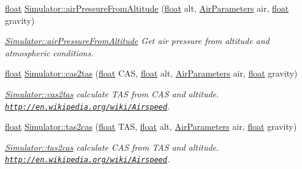 \begin{DoxyCompactItemize}
\item 
\hyperlink{_super_l_u_support_8h_a6a1bb6ed41f44b60e7bd83b0e9945aa7}{float} \hyperlink{group___h_i_t_l_plugin_gab5a7232560191dad8ff19517ed4a327a}{Simulator\-::air\-Pressure\-From\-Altitude} (\hyperlink{_super_l_u_support_8h_a6a1bb6ed41f44b60e7bd83b0e9945aa7}{float} alt, \hyperlink{struct_air_parameters}{Air\-Parameters} air, \hyperlink{_super_l_u_support_8h_a6a1bb6ed41f44b60e7bd83b0e9945aa7}{float} gravity)
\begin{DoxyCompactList}\small\item\em \hyperlink{group___h_i_t_l_plugin_gab5a7232560191dad8ff19517ed4a327a}{Simulator\-::air\-Pressure\-From\-Altitude} Get air pressure from altitude and atmospheric conditions. \end{DoxyCompactList}\item 
\hyperlink{_super_l_u_support_8h_a6a1bb6ed41f44b60e7bd83b0e9945aa7}{float} \hyperlink{group___h_i_t_l_plugin_ga86d7635f63f32cf0ef08e21a7e2874ea}{Simulator\-::cas2tas} (\hyperlink{_super_l_u_support_8h_a6a1bb6ed41f44b60e7bd83b0e9945aa7}{float} C\-A\-S, \hyperlink{_super_l_u_support_8h_a6a1bb6ed41f44b60e7bd83b0e9945aa7}{float} alt, \hyperlink{struct_air_parameters}{Air\-Parameters} air, \hyperlink{_super_l_u_support_8h_a6a1bb6ed41f44b60e7bd83b0e9945aa7}{float} gravity)
\begin{DoxyCompactList}\small\item\em \hyperlink{group___h_i_t_l_plugin_ga86d7635f63f32cf0ef08e21a7e2874ea}{Simulator\-::cas2tas} calculate T\-A\-S from C\-A\-S and altitude. \href{http://en.wikipedia.org/wiki/Airspeed}{\tt http\-://en.\-wikipedia.\-org/wiki/\-Airspeed}. \end{DoxyCompactList}\item 
\hyperlink{_super_l_u_support_8h_a6a1bb6ed41f44b60e7bd83b0e9945aa7}{float} \hyperlink{group___h_i_t_l_plugin_gaf6d17454fad82383037d44ed3cb93a12}{Simulator\-::tas2cas} (\hyperlink{_super_l_u_support_8h_a6a1bb6ed41f44b60e7bd83b0e9945aa7}{float} T\-A\-S, \hyperlink{_super_l_u_support_8h_a6a1bb6ed41f44b60e7bd83b0e9945aa7}{float} alt, \hyperlink{struct_air_parameters}{Air\-Parameters} air, \hyperlink{_super_l_u_support_8h_a6a1bb6ed41f44b60e7bd83b0e9945aa7}{float} gravity)
\begin{DoxyCompactList}\small\item\em \hyperlink{group___h_i_t_l_plugin_gaf6d17454fad82383037d44ed3cb93a12}{Simulator\-::tas2cas} calculate C\-A\-S from T\-A\-S and altitude. \href{http://en.wikipedia.org/wiki/Airspeed}{\tt http\-://en.\-wikipedia.\-org/wiki/\-Airspeed}. \end{DoxyCompactList}\item 

\end{DoxyCompactItemize}

